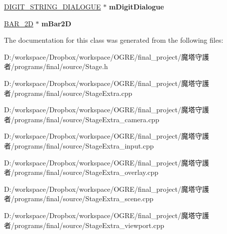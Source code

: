\begin{DoxyCompactItemize}
\item 
\hypertarget{class_stage_extra_a8ffa9122b5f01293a62642aaa45a18e5}{
\hyperlink{class_d_i_g_i_t___s_t_r_i_n_g___d_i_a_l_o_g_u_e}{DIGIT\_\-STRING\_\-DIALOGUE} $\ast$ {\bfseries mDigitDialogue}}
\label{class_stage_extra_a8ffa9122b5f01293a62642aaa45a18e5}

\item 
\hypertarget{class_stage_extra_a26975256a8220cd4b237a1573317e9b6}{
\hyperlink{class_b_a_r__2_d}{BAR\_\-2D} $\ast$ {\bfseries mBar2D}}
\label{class_stage_extra_a26975256a8220cd4b237a1573317e9b6}

\end{DoxyCompactItemize}


The documentation for this class was generated from the following files:\begin{DoxyCompactItemize}
\item 
D:/workspace/Dropbox/workspace/OGRE/final\_\-project/魔塔守護者/programs/final/source/Stage.h\item 
D:/workspace/Dropbox/workspace/OGRE/final\_\-project/魔塔守護者/programs/final/source/StageExtra.cpp\item 
D:/workspace/Dropbox/workspace/OGRE/final\_\-project/魔塔守護者/programs/final/source/StageExtra\_\-camera.cpp\item 
D:/workspace/Dropbox/workspace/OGRE/final\_\-project/魔塔守護者/programs/final/source/StageExtra\_\-input.cpp\item 
D:/workspace/Dropbox/workspace/OGRE/final\_\-project/魔塔守護者/programs/final/source/StageExtra\_\-overlay.cpp\item 
D:/workspace/Dropbox/workspace/OGRE/final\_\-project/魔塔守護者/programs/final/source/StageExtra\_\-scene.cpp\item 
D:/workspace/Dropbox/workspace/OGRE/final\_\-project/魔塔守護者/programs/final/source/StageExtra\_\-viewport.cpp\end{DoxyCompactItemize}
